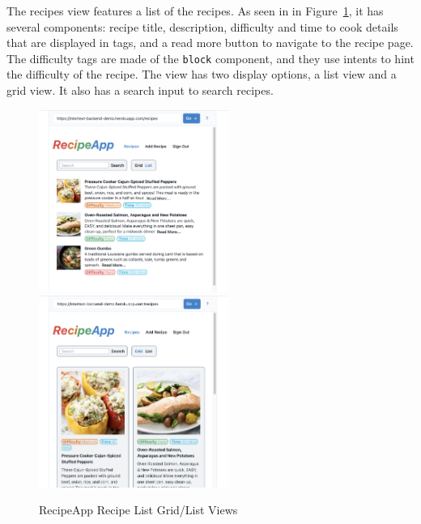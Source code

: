 The recipes view features a list of the recipes. As seen in in Figure~\ref{fig:rec_recipe_list}, it has several components: recipe title, description, difficulty and time to cook details that are displayed in tags, and a read more button to navigate to the recipe page. The difficulty tags are made of the \texttt{block} component, and they use intents to hint the difficulty of the recipe. The view has two display options, a list view and a grid view. It also has a search input to search recipes.

\begin{figure}[htb]
  \centering
  \includegraphics[width=6.2cm]{thesis/paper/images/recipe_list.png}
  \,
  \includegraphics[width=6.2cm]{thesis/paper/images/recipe_grid.png}
  \caption{RecipeApp Recipe List Grid/List Views}%
  \label{fig:rec_recipe_list}%
\end{figure}

